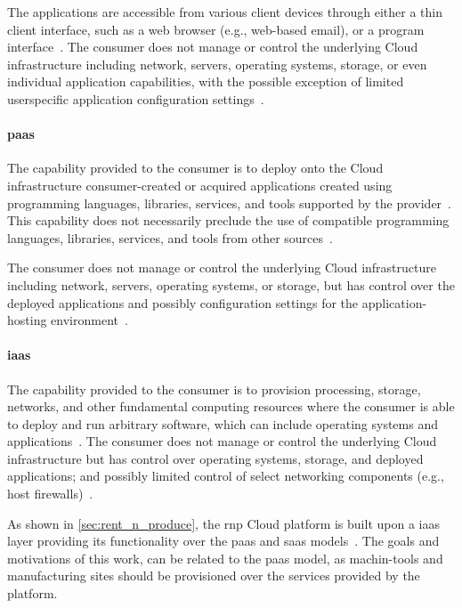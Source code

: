 \documentclass[
a4paper,
twoside,
headsepline,
cleardoublepage=empty,
parskip=half,
draft=false
]{scrbook}
\begin{document}
			The applications are accessible from various client devices through either a thin client interface, such as a web browser (e.g., web-based email), or a program interface~\cite{mell2011nist}.
			The consumer does not manage or control the underlying Cloud infrastructure including network, servers, operating systems, storage, or even individual application capabilities, with the possible exception of limited userspecific application configuration settings~\cite{mell2011nist}.

			\paragraph{\gls{paas}} The capability provided to the consumer is to deploy onto the Cloud infrastructure consumer-created or acquired applications created using programming languages, libraries, services, and tools supported by the provider~\cite{fehling2014cloud}.
			This capability does not necessarily preclude the use of compatible programming languages, libraries, services, and tools from other sources~\cite{leymann2011cloud}.
			
			The consumer does not manage or control the underlying Cloud infrastructure including network, servers, operating systems, or storage, but has control over the deployed applications and possibly configuration settings for the application-hosting environment~\cite{leymann2011cloud}.

			\paragraph{\gls{iaas}} The capability provided to the consumer is to provision processing, storage, networks, and other fundamental computing resources where the consumer is able to deploy and run arbitrary software, which can include operating systems and applications~\cite{leymann2011cloud}. 
			The consumer does not manage or control the underlying Cloud infrastructure but has control over operating systems, storage, and deployed applications; and possibly limited control of select networking components (e.g., host firewalls)~\cite{mell2011nist}.

			As shown in \cref{sec:rent_n_produce}, the \gls{rnp} Cloud platform is built upon a \gls{iaas} layer providing its functionality over the \gls{paas} and \gls{saas} models~\cite{xen.17b}. 
			The goals and motivations of this work, can be related to the \gls{paas} model, as machin-tools and manufacturing sites should be provisioned over the services provided by the platform.
\end{document}
